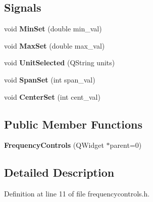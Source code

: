 \subsection*{Signals}
\begin{DoxyCompactItemize}
\item 
void {\bfseries Min\+Set} (double min\+\_\+val)\hypertarget{class_frequency_controls_a3544c74823a7aaabc9a0779ae839eb7f}{}\label{class_frequency_controls_a3544c74823a7aaabc9a0779ae839eb7f}

\item 
void {\bfseries Max\+Set} (double max\+\_\+val)\hypertarget{class_frequency_controls_ad8606de91f4ec71aa8011f658da35a4e}{}\label{class_frequency_controls_ad8606de91f4ec71aa8011f658da35a4e}

\item 
void {\bfseries Unit\+Selected} (Q\+String units)\hypertarget{class_frequency_controls_a5b873965eb03064dbcf713d0c66126d0}{}\label{class_frequency_controls_a5b873965eb03064dbcf713d0c66126d0}

\item 
void {\bfseries Span\+Set} (int span\+\_\+val)\hypertarget{class_frequency_controls_aef534d12777d179c45b59a47c8c1b431}{}\label{class_frequency_controls_aef534d12777d179c45b59a47c8c1b431}

\item 
void {\bfseries Center\+Set} (int cent\+\_\+val)\hypertarget{class_frequency_controls_afd8a0e6ada7b9063e15d55c9c6b562cb}{}\label{class_frequency_controls_afd8a0e6ada7b9063e15d55c9c6b562cb}

\end{DoxyCompactItemize}
\subsection*{Public Member Functions}
\begin{DoxyCompactItemize}
\item 
{\bfseries Frequency\+Controls} (Q\+Widget $\ast$parent=0)\hypertarget{class_frequency_controls_a41928b0575667ca2677e824a0907285b}{}\label{class_frequency_controls_a41928b0575667ca2677e824a0907285b}

\end{DoxyCompactItemize}


\subsection{Detailed Description}


Definition at line 11 of file frequencycontrols.\+h.

